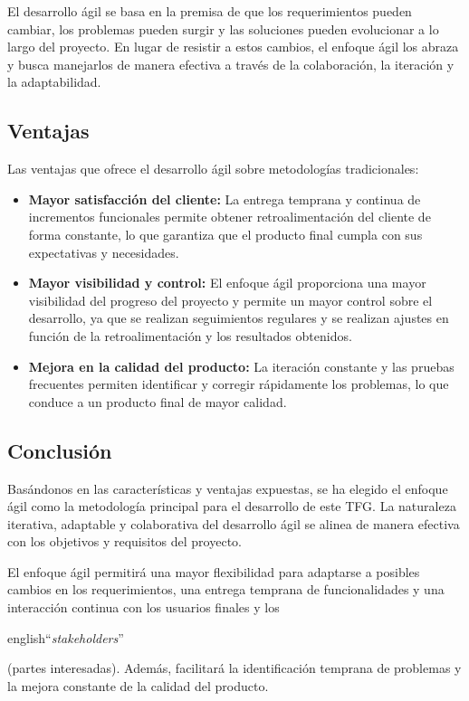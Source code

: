 El desarrollo ágil se basa en la premisa de que los requerimientos pueden cambiar, los problemas pueden surgir y las soluciones pueden evolucionar a lo largo del proyecto. En lugar de resistir a estos cambios, el enfoque ágil los abraza y busca manejarlos de manera efectiva a través de la colaboración, la iteración y la adaptabilidad.

\subsection{Ventajas}

Las ventajas que ofrece el desarrollo ágil sobre metodologías tradicionales:

\begin{itemize}
\item \textbf{Mayor satisfacción del cliente:} La entrega temprana y continua de incrementos funcionales permite obtener retroalimentación del cliente de forma constante, lo que garantiza que el producto final cumpla con sus expectativas y necesidades.
\item \textbf{Mayor visibilidad y control:} El enfoque ágil proporciona una mayor visibilidad del progreso del proyecto y permite un mayor control sobre el desarrollo, ya que se realizan seguimientos regulares y se realizan ajustes en función de la retroalimentación y los resultados obtenidos.
\item \textbf{Mejora en la calidad del producto:} La iteración constante y las pruebas frecuentes permiten identificar y corregir rápidamente los problemas, lo que conduce a un producto final de mayor calidad.
\end{itemize}

\subsection{Conclusión}

Basándonos en las características y ventajas expuestas, se ha elegido el enfoque ágil como la metodología principal para el desarrollo de este TFG. La naturaleza iterativa, adaptable y colaborativa del desarrollo ágil se alinea de manera efectiva con los objetivos y requisitos del proyecto.

El enfoque ágil permitirá una mayor flexibilidad para adaptarse a posibles cambios en los requerimientos, una entrega temprana de funcionalidades y una interacción continua con los usuarios finales y los \begin{otherlanguage}
{english}``\textit{stakeholders}''\end{otherlanguage}(partes interesadas). Además, facilitará la identificación temprana de problemas y la mejora constante de la calidad del producto.

